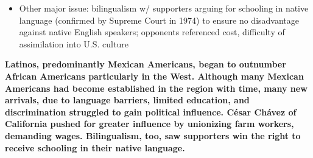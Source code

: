 \documentclass[a4paper]{article}
\begin{document}
{\begin{itemize}
\begin{itemize}
                \item Supported Robert Kennedy in election
            \end{itemize}
            \item Other major issue: bilingualism w/ supporters arguing for schooling in native language (confirmed by Supreme Court in 1974) to ensure no disadvantage against native English speakers; opponents referenced cost, difficulty of assimilation into U.S. culture
        \end{itemize}
        \textbf{Latinos, predominantly Mexican Americans, began to outnumber African Americans particularly in the West. Although many Mexican Americans had become established in the region with time, many new arrivals, due to language barriers, limited education, and discrimination struggled to gain political influence. César Chávez of California pushed for greater influence by unionizing farm workers, demanding wages. Bilingualism, too, saw supporters win the right to receive schooling in their native language.}}
\end{document}
